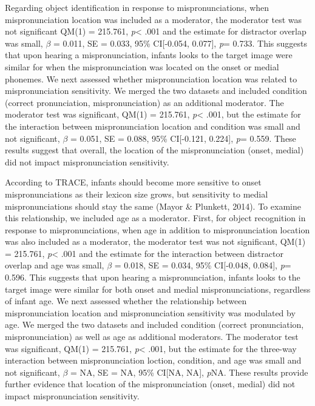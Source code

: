 \documentclass[man]{apa6}
\theoremstyle{definition}
\theoremstyle{definition}
\theoremstyle{definition}
\theoremstyle{remark}
\begin{document}
Regarding object identification in response to mispronunciations, when
mispronunciation location was included as a moderator, the moderator
test was not significant QM(1) = 215.761, \emph{p}\textless{} .001 and
the estimate for distractor overlap was small, \(\beta\) = 0.011, SE =
0.033, 95\% CI{[}-0.054, 0.077{]}, \emph{p}= 0.733. This suggests that
upon hearing a mispronunciation, infants looks to the target image were
similar for when the mispronunciation was located on the onset or medial
phonemes. We next assessed whether mispronunciation location was related
to mispronunciation sensitivity. We merged the two datasets and included
condition (correct pronunciation, mispronunciation) as an additional
moderator. The moderator test was significant, QM(1) = 215.761,
\emph{p}\textless{} .001, but the estimate for the interaction between
mispronunciation location and condition was small and not significant,
\(\beta\) = 0.051, SE = 0.088, 95\% CI{[}-0.121, 0.224{]}, \emph{p}=
0.559. These results suggest that overall, the location of the
mispronunciation (onset, medial) did not impact mispronunciation
sensitivity.

According to TRACE, infants should become more sensitive to onset
mispronunciations as their lexicon size grows, but sensitivity to medial
mispronunciations should stay the same (Mayor \& Plunkett, 2014). To
examine this relationship, we included age as a moderator. First, for
object recognition in response to mispronunciations, when age in
addition to mispronunciation location was also included as a moderator,
the moderator test was not significant, QM(1) = 215.761,
\emph{p}\textless{} .001 and the estimate for the interaction between
distractor overlap and age was small, \(\beta\) = 0.018, SE = 0.034,
95\% CI{[}-0.048, 0.084{]}, \emph{p}= 0.596. This suggests that upon
hearing a mispronunciation, infants looks to the target image were
similar for both onset and medial mispronunciations, regardless of
infant age. We next assessed whether the relationship between
mispronunciation location and mispronunciation sensitivity was modulated
by age. We merged the two datasets and included condition (correct
pronunciation, mispronunciation) as well as age as additional
moderators. The moderator test was significant, QM(1) = 215.761,
\emph{p}\textless{} .001, but the estimate for the three-way interaction
between mispronunciation loction, condition, and age was small and not
significant, \(\beta\) = NA, SE = NA, 95\% CI{[}NA, NA{]}, \emph{p}NA.
These results provide further evidence that location of the
mispronunciation (onset, medial) did not impact mispronunciation
sensitivity.
\end{document}
